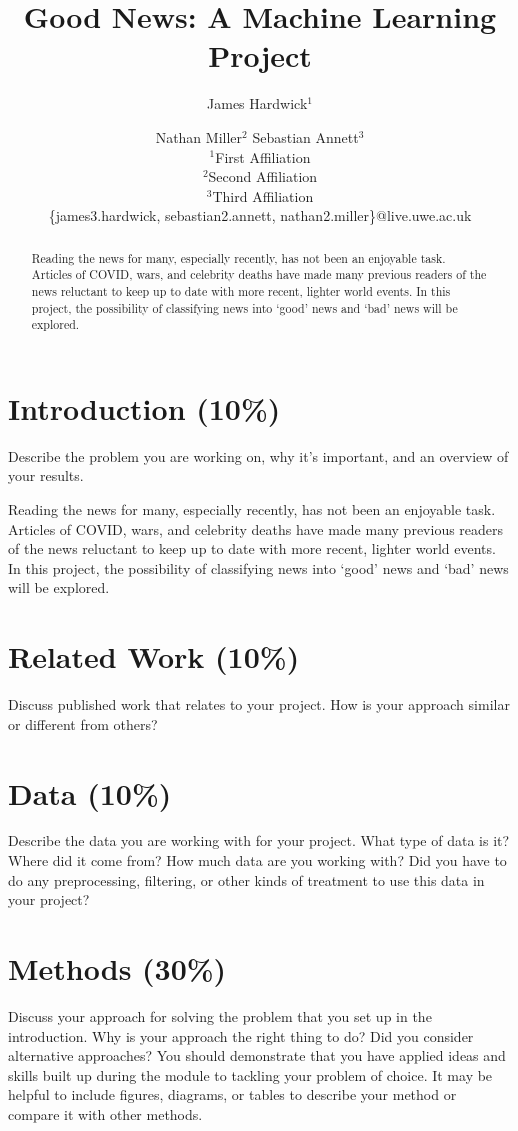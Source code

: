 \documentclass{article}
\title{Good News: A Machine Learning Project}
\author{
James Hardwick$^1$\and
Nathan Miller$^2$\And
Sebastian Annett$^3$\\
\affiliations
$^1$First Affiliation\\
$^2$Second Affiliation\\
$^3$Third Affiliation\\
\emails
\{james3.hardwick, sebastian2.annett, nathan2.miller\}@live.uwe.ac.uk
}
\begin{document}
\maketitle

\begin{abstract}
    Reading the news for many, especially recently, has not been an enjoyable task. Articles of COVID, wars, and celebrity deaths have made many previous readers of the news reluctant to keep up to date with more recent, lighter world events. In this project, the possibility of classifying news into `good' news and `bad' news will be explored.
\end{abstract}

\section{Introduction (10\%)}

Describe the problem you are working on, why it's important, and an overview of your results.

Reading the news for many, especially recently, has not been an enjoyable task. Articles of COVID, wars, and celebrity deaths have made many previous readers of the news reluctant to keep up to date with more recent, lighter world events. In this project, the possibility of classifying news into `good' news and `bad' news will be explored.

\section{Related Work (10\%)}

Discuss published work that relates to your project. How is your approach similar or different from others?

\section{Data (10\%)}

Describe the data you are working with for your project. What type of data is it? Where did it come from? How much data are you working with? Did you have to do any preprocessing, filtering, or other kinds of treatment to use this data in your project?

\section{Methods (30\%)}

Discuss your approach for solving the problem that you set up in the introduction. Why is your approach the right thing to do? Did you consider alternative approaches? You should demonstrate that you have applied ideas and skills built up during the module to tackling your problem of choice. It may be helpful to include figures, diagrams, or tables to describe your method or compare it with other methods.
\end{document}
